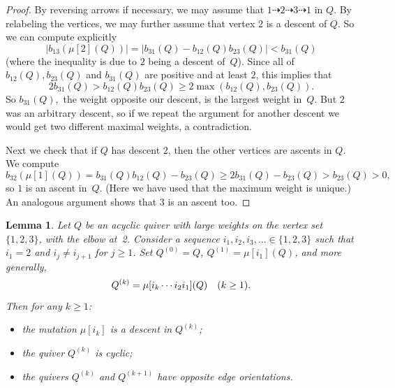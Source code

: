 \documentclass[11pt, letterpaper]{amsart}
\newtheorem{lemma}[theorem]{Lemma}
\theoremstyle{definition}
\numberwithin{equation}{section}
\newcommand{\T}[2]{\mu[#1](#2)} %
\newcommand{\points}{\!\dasharrow\!}
\begin{document}
\begin{proof}
By reversing arrows if necessary, we may assume that $1 \points 2 \points 3 \points 1$ in $Q.$ By relabeling the vertices, we may further assume that vertex $2$ is a descent of $Q.$ So we can compute explicitly
\[
|b_{13}(\mu[2](Q))| = |b_{31}(Q) - b_{12}(Q) b_{23}(Q)| < b_{31}(Q) 
\]
(where the inequality is due to $2$ being a descent of~$Q$). Since all of $b_{12}(Q), b_{23}(Q)$ and $b_{31}(Q)$ are positive and at least $2$, 
this implies that 
\[
2 b_{31}(Q) > b_{12}(Q) b_{23}(Q) \geq 2 \max (b_{12}(Q), b_{23}(Q)).
\]
So $b_{31}(Q),$ the weight opposite our descent, is the largest weight in~$Q.$ 
But $2$ was an arbitrary descent, so if we repeat the argument for another descent we would get two different maximal weights, a contradiction.

Next we check that if $Q$ has descent $2$, then the other vertices are ascents in $Q$. 
We compute
\[
b_{32}(\T{1}{Q}) = b_{31}(Q) b_{12}(Q) - b_{23}(Q) \ge 2 b_{31}(Q) - b_{23}(Q) > b_{23}(Q) > 0,
\]
so $1$ is an ascent in~$Q$. (Here we have used that the maximum weight is unique.) 
An analogous argument shows that $3$ is an ascent too.
\end{proof}

\begin{lemma}
\label{lem:3VertexAcyclicAscents}
Let $Q$ be an acyclic quiver with large weights on the vertex set $\{1,2,3\}$,
with the elbow at~2.  
Consider a sequence $i_1, i_2, i_3,\ldots\in\{1,2,3\}$ such that $i_1=2$ and $i_j\ne i_{j+1}$ for $j\ge 1$. 
Set $Q^{(0)}=Q$, $Q^{(1)}=\mu[i_1](Q)$, and more generally, 
\begin{equation}
\label{eq:Q^{(k)}}
Q^{(k)}=\mu[i_k \cdots i_2 i_1](Q) \quad (k\ge1).
\end{equation}
Then for any $k\ge 1$: 
\begin{itemize}[leftmargin=.2in]
\item
the mutation $\mu[i_{k}]$ is a descent in $Q^{(k)}$; 
\item
the quiver $Q^{(k)}$  is cyclic;
\item
the quivers $Q^{(k)}$ and $Q^{(k+1)}$ have opposite edge orientations. 
\end{itemize}
\end{lemma}
\end{document}
